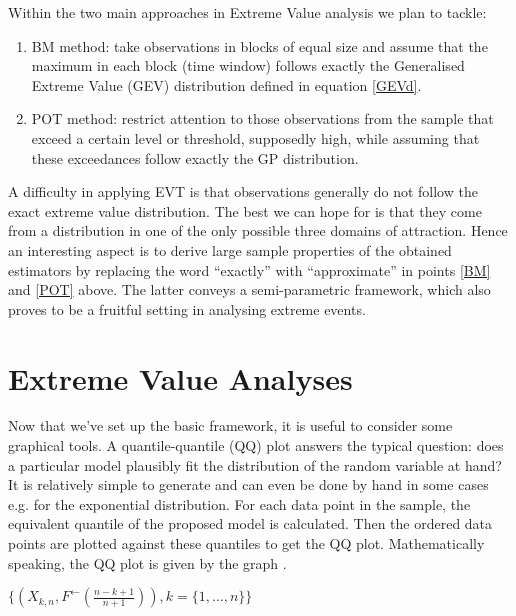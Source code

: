 Within the two main approaches in Extreme Value analysis we plan to tackle:
\begin{enumerate}
\item\label{BM} BM method: take observations in blocks of equal size and assume that the maximum in each block (time window) follows exactly the Generalised Extreme Value (GEV) distribution defined in equation \ref{GEVd}.
\item\label{POT} POT method: restrict attention to those observations from the sample that exceed a certain level or threshold, supposedly high, while assuming that these exceedances follow exactly the GP distribution.
\end{enumerate}

A difficulty in applying EVT is that observations generally do not follow the exact extreme value distribution. The best we can hope for is that they come from a distribution in one of the only possible three domains of attraction. Hence an interesting aspect is to derive large sample properties of the obtained estimators by replacing the word ``exactly'' with ``approximate'' in points \ref{BM} and \ref{POT} above. The latter conveys a semi-parametric framework, which also proves to be a  fruitful setting in analysing extreme events. 


\section{Extreme Value Analyses} \label{subsec:EVres}

Now that we've set up the basic framework, it is useful to consider some graphical tools. A quantile-quantile (QQ) plot answers the typical question: does a particular model plausibly fit the distribution of the random variable at hand? It is relatively simple to generate and can even be done by hand in some cases e.g. for the exponential distribution. For each data point in the sample, the equivalent quantile of the proposed model is calculated. Then the ordered data points are plotted against these quantiles to get the QQ plot. Mathematically speaking, the QQ plot is given by the graph \cite[ch.~6]{embrechts}. \newline

\centerline{$\{(X_{k,n},F^{\leftarrow}(\frac{n-k+1}{n+1})), k = \{1,...,n\}\}$}

